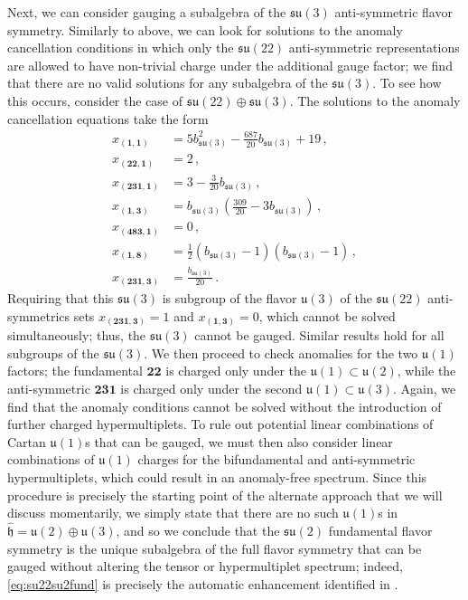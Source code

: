 \documentclass[11pt, a4paper]{article}
\newcommand*{\fkh}{\ensuremath{\mathfrak{h}}}
\newcommand*{\fku}{\ensuremath{\mathfrak{u}}}
\newcommand*{\fksu}{\ensuremath{\mathfrak{su}}}
\begin{document}
Next, we can consider gauging a subalgebra of the $\fksu(3)$ anti-symmetric flavor symmetry. Similarly to above, we can look for solutions to the anomaly cancellation conditions in which only the $\fksu(22)$ anti-symmetric representations are allowed to have non-trivial charge under the additional gauge factor; we find that there are no valid solutions for any subalgebra of the $\fksu(3)$. To see how this occurs, consider the case of $\fksu(22) \oplus \fksu(3)$. The solutions to the anomaly cancellation equations take the form
    \begin{equation}
        \begin{aligned}
            x_{(\bm{1}, \bm{1})} &= 5 b_{\fksu(3)}^2 - \frac{687}{20} b_{\fksu(3)} + 19\,, \\
            x_{(\bm{22}, \bm{1})} &= 2\,, \\
            x_{(\bm{231}, \bm{1})} &= 3 - \frac{3}{20} b_{\fksu(3)}\,, \\
            x_{(\bm{1}, \bm{3})} &= b_{\fksu(3)} \left(\frac{309}{20} - 3 b_{\fksu(3)}\right)\,, \\
            x_{(\bm{483}, \bm{1})} &= 0\,, \\
            x_{(\bm{1}, \bm{8})} &= \frac{1}{2} (b_{\fksu(3)} - 1) (b_{\fksu(3)} - 1)\,, \\
            x_{(\bm{231}, \bm{3})} &= \frac{b_{\fksu(3)}}{20}\,.
        \end{aligned}
    \end{equation}
Requiring that this $\fksu(3)$ is subgroup of the flavor $\fku(3)$ of the $\fksu(22)$ anti-symmetrics sets $x_{(\bm{231}, \bm{3})} = 1$ and $x_{(\bm{1}, \bm{3})} = 0$, which cannot be solved simultaneously; thus, the $\fksu(3)$ cannot be gauged.
Similar results hold for all subgroups of the $\fksu(3)$. We then proceed to check anomalies for the two $\fku(1)$ factors; the fundamental $\bm{22}$ is charged only under the $\fku(1) \subset \fku(2)$, while the anti-symmetric $\bm{231}$ is charged only under the second $\fku(1) \subset \fku(3)$. Again, we find that the anomaly conditions cannot be solved without the introduction of further charged hypermultiplets. To rule out potential linear combinations of Cartan $\fku(1)$s that can be gauged, we must then also consider linear combinations of $\fku(1)$ charges for the bifundamental and anti-symmetric hypermultiplets, which could result in an anomaly-free spectrum. Since this procedure is precisely the starting point of the alternate approach that we will discuss momentarily, we simply state that there are no such $\fku(1)$s in $\hat{\fkh} = \fku(2) \oplus \fku(3)$, and so we conclude that the $\fksu(2)$ fundamental flavor symmetry is the unique subalgebra of the full flavor symmetry that can be gauged without altering the tensor or hypermultiplet spectrum; indeed, \cref{eq:su22su2fund} is precisely the automatic enhancement identified in \cite{Raghuram:2020vxm}.
\end{document}
